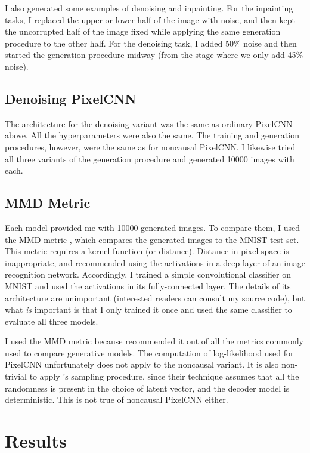 \documentclass[11pt, a4paper, openany]{book}
\begin{document}
I also generated some examples of denoising and inpainting. For the inpainting tasks, I replaced the upper or lower half of the image with noise, and then kept the uncorrupted half of the image fixed while applying the same generation procedure to the other half. For the denoising task, I added 50\% noise and then started the generation procedure midway (from the stage where we only add 45\% noise).

\section{Denoising PixelCNN}

The architecture for the denoising variant was the same as ordinary PixelCNN above. All the hyperparameters were also the same. The training and generation procedures, however, were the same as for noncausal PixelCNN. I likewise tried all three variants of the generation procedure and generated 10000 images with each.

\section{MMD Metric}

Each model provided me with 10000 generated images. To compare them, I used the MMD metric \citep{mmd,ganmetrics}, which compares the generated images to the MNIST test set. This metric requires a kernel function (or distance). Distance in pixel space is inappropriate, and \citet{ganmetrics} recommended using the activations in a deep layer of an image recognition network. Accordingly, I trained a simple convolutional classifier on MNIST and used the activations in its fully-connected layer. The details of its architecture are unimportant (interested readers can consult my source code), but what \emph{is} important is that I only trained it once and used the same classifier to evaluate all three models.

I used the MMD metric because \citet{ganmetrics} recommended it out of all the metrics commonly used to compare generative models. The computation of log-likelihood used for PixelCNN unfortunately does not apply to the noncausal variant. It is also non-trivial to apply \citet{likelihoodestimation}'s sampling procedure, since their technique assumes that all the randomness is present in the choice of latent vector, and the decoder model is deterministic. This is not true of noncausal PixelCNN either.


\chapter{Results}
\label{cha:result}
\end{document}
